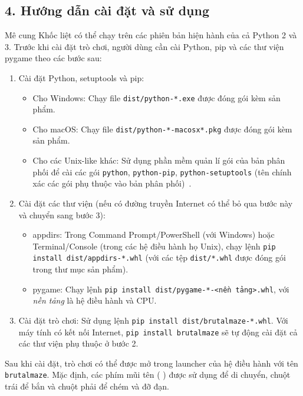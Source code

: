 \documentclass[a4paper,12pt]{article}
\begin{document}
\subsection*{4. Hướng dẫn cài đặt và sử dụng}
Mê cung Khốc liệt có thể chạy trên các phiên bản hiện hành của cả Python 2 và
3. Trước khi cài đặt trò chơi, người dùng cần cài Python, pip và các thư viện
pygame theo các bước sau:
\begin{enumerate}
  \item Cài đặt Python, setuptools và pip:
    \begin{itemize}
      \item Cho Windows: Chạy file \verb|dist/python-*.exe| được đóng gói kèm
        sản phẩm.
      \item Cho macOS: Chạy file \verb|dist/python-*-macosx*.pkg| được đóng gói
        kèm sản phẩm.
      \item Cho các Unix-like khác: Sử dụng phần mềm quản lí gói của bản phân
        phối để cài các gói \verb|python|, \verb|python-pip|,
        \verb|python-setuptools| (tên chính xác các gói phụ thuộc vào bản phân
        phối)~\cite{nixpip}.
    \end{itemize}
  \item Cài đặt các thư viện (nếu có đường truyền Internet có thể bỏ qua bước
    này và chuyển sang bước 3):
    \begin{itemize}
      \item appdirs: Trong Command Prompt/PowerShell (với Windows) hoặc
        \mbox{Terminal/Console} (trong các hệ điều hành họ Unix), chạy lệnh
        \verb|pip install dist/appdirs-*.whl| (với các tệp \verb|dist/*.whl|
        được đóng gói trong thư mục sản phẩm).
      \item pygame: Chạy lệnh \verb|pip install dist/pygame-*-<nền tảng>.whl|,
        với \emph{nền tảng} là hệ điều hành và CPU.
    \end{itemize}
  \item Cài đặt trò chơi: Sử dụng lệnh \verb|pip install dist/brutalmaze-*.whl|.
    Với máy tính có kết nối Internet, \verb|pip install brutalmaze| sẽ tự động
    cài đặt cả các thư viện phụ thuộc ở bước 2.
\end{enumerate}

Sau khi cài đặt, trò chơi có thể được mở trong launcher của hệ điều hành với
tên \verb|brutalmaze|. Mặc định, các phím mũi tên (\textuparrow \textleftarrow
\textdownarrow \textrightarrow) được sử dụng để di chuyển, chuột trái để bắn và
chuột phải để chém và đỡ đạn.
\end{document}
